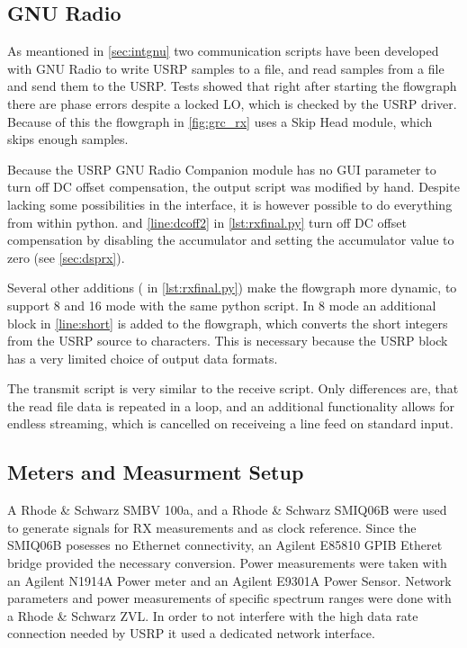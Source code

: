 \documentclass[12pt,a4paper,parskip=full]{scrartcl}
\begin{document}
\subsection{GNU Radio}
\label{sec:measgnu}
As meantioned in \cref{sec:intgnu} two communication scripts have been developed with GNU
Radio to write USRP samples to a file, and read samples from a file and send them to the USRP.
Tests showed that right after starting the flowgraph there are phase errors despite a
locked LO, which is checked by the USRP driver. Because of this the flowgraph in \cref{fig:grc_rx}
uses a {\ttfamily Skip Head} module, which skips enough samples.

Because the USRP GNU Radio Companion module has no GUI parameter to turn off DC offset
compensation, the output script was modified by hand. Despite lacking some possibilities
in the interface, it is however possible to do everything from within python.
 and \cref{line:dcoff2} in \cref{lst:rxfinal.py} turn off DC offset
compensation by disabling the accumulator and setting the accumulator value to zero 
(see \cref{sec:dsprx}).

Several other additions ( in \cref{lst:rxfinal.py})
make the flowgraph more dynamic, to support \SI{8}{\bit} and \SI{16}{\bit} mode with
the same python script. In \SI{8}{\bit} mode an additional block in \cref{line:short}
is added to the flowgraph, which converts the short integers from the USRP source to
characters. This is necessary because the USRP block has a very limited choice of
output data formats.

The transmit script is very similar to the receive script. Only differences are,
that the read file data is repeated in a loop, and an additional functionality
allows for endless streaming, which is cancelled on receiveing a line feed on
standard input.
\subsection{Meters and Measurment Setup}
A Rhode \& Schwarz SMBV 100a, and a Rhode \& Schwarz SMIQ06B were used to generate
signals for RX measurements and as clock reference. Since the SMIQ06B posesses no
Ethernet connectivity, an Agilent E85810 GPIB Etheret bridge provided the necessary
conversion. Power measurements were taken with an Agilent N1914A Power meter and an
Agilent E9301A Power Sensor. Network parameters and power measurements of specific
spectrum ranges were done with a Rhode \& Schwarz ZVL. In order to not interfere
with the high data rate connection needed by USRP it used a dedicated network interface.
\end{document}
